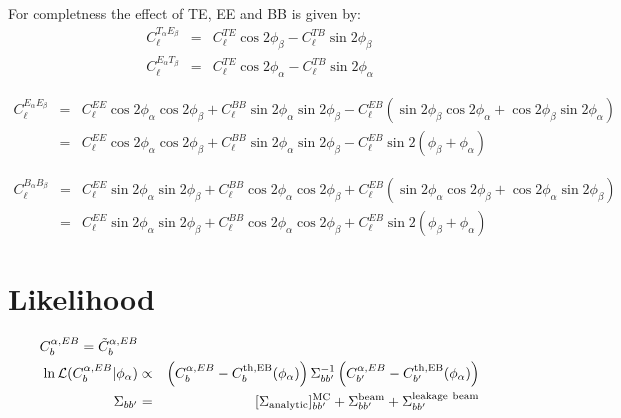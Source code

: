 \documentclass[a4paper, 11pt]{article}
\def\ba{\begin{eqnarray}}
\def\ea{\end{eqnarray}}
\begin{document}
For completness the effect of TE, EE and BB is given by:
\ba
C^{T_{\alpha} E_{\beta}}_{\ell} &=& C^{TE}_{\ell}  \cos 2\phi_{\beta} - C^{TB}_{\ell}   \sin 2\phi_{\beta} \\
C^{E_{\alpha} T_{\beta}}_{\ell} &=& C^{TE}_{\ell}  \cos 2\phi_{\alpha} - C^{TB}_{\ell}   \sin 2\phi_{\alpha}
\ea


\ba
C^{E_{\alpha} E_{\beta}}_{\ell} &=&  C^{EE}_{\ell} \cos 2\phi_{\alpha} \cos 2\phi_{\beta} + C^{BB}_{\ell} \sin 2\phi_{\alpha} \sin 2\phi_{\beta} - C^{EB}_{\ell} ( \sin 2\phi_{\beta}  \cos 2\phi_{\alpha} +\cos 2\phi_{\beta} \sin 2\phi_{\alpha} ) \nonumber \\
&=& C^{EE}_{\ell} \cos 2\phi_{\alpha} \cos 2\phi_{\beta} + C^{BB}_{\ell} \sin 2\phi_{\alpha} \sin 2\phi_{\beta} - C^{EB}_{\ell}  \sin 2(\phi_{\beta} + \phi_{\alpha} ) 
\ea


\ba
C^{B_{\alpha} B_{\beta}}_{\ell} &=&  C^{EE}_{\ell} \sin 2\phi_{\alpha} \sin 2\phi_{\beta} + C^{BB}_{\ell} \cos 2\phi_{\alpha} \cos 2\phi_{\beta} + C^{EB}_{\ell}(\sin 2\phi_{\alpha} \cos 2\phi_{\beta} + \cos 2\phi_{\alpha} \sin 2\phi_{\beta} ) \nonumber \\
&=&  C^{EE}_{\ell} \sin 2\phi_{\alpha} \sin 2\phi_{\beta} + C^{BB}_{\ell} \cos 2\phi_{\alpha} \cos 2\phi_{\beta} + C^{EB}_{\ell}  \sin 2(\phi_{\beta} + \phi_{\alpha} ) 
\ea

\section{Likelihood} 

\ba
C_{b}^{\alpha, EB} = \tilde{C}_{b}^{\alpha, EB} \\
\ln {\cal L} ( C_{b}^{\alpha, EB} |  \phi_\alpha) &\propto&  \left(  C_{b}^{\alpha, EB} -  C_{b}^{\rm th , EB}(\phi_\alpha) \right) \Sigma^{-1}_{bb'} \left(  C_{b'}^{\alpha, EB} -  C_{b'}^{\rm th , EB}(\phi_\alpha) \right) \\
\Sigma_{bb'} &=&  [\Sigma_{\rm analytic}]^{\rm MC }_{bb'} + \Sigma^{\rm beam}_{bb'}  + \Sigma^{\rm leakage \ beam}_{bb'}
\ea
\end{document}
